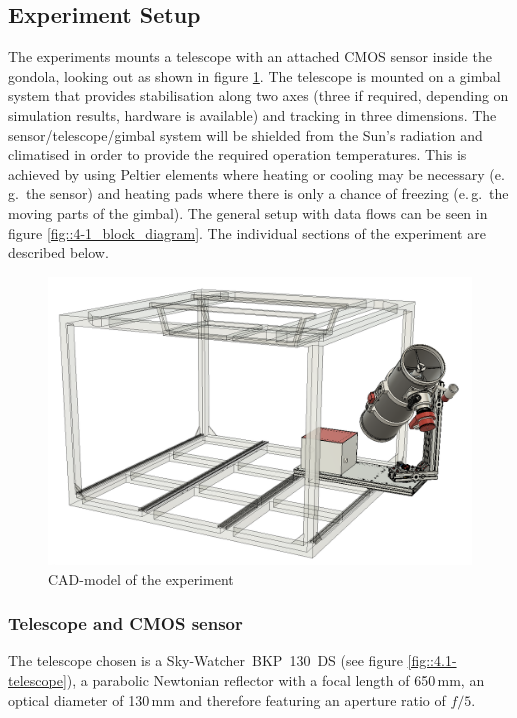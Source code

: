 \subsection{Experiment Setup} \label{Experiment_Setup}




The experiments mounts a telescope with an attached CMOS sensor inside the gondola, looking out as shown in figure \ref{fig::4-1_CAD}. The telescope is mounted on a gimbal system that provides stabilisation along two axes (three if required, depending on simulation results, hardware is available) and tracking in three dimensions. The sensor/telescope/gimbal system will be shielded from the Sun's radiation and climatised in order to provide the required operation temperatures. This is achieved by using Peltier elements where heating or cooling may be necessary (e.\,g.~the sensor) and heating pads where there is only a chance of freezing (e.\,g.~the moving parts of the gimbal). The general setup with data flows can be seen in figure \ref{fig::4-1_block_diagram}. The individual sections of the experiment are described below.

\begin{figure}[h]
	\centering
	\includegraphics[width=0.7\linewidth]{4-experiment-design/img/mechanical/iso0.png}
	\caption{CAD-model of the experiment}
	\label{fig::4-1_CAD}
\end{figure}


\subsubsection{Telescope and CMOS sensor}
The telescope chosen is a Sky-Watcher~BKP~130~DS (see figure \ref{fig::4.1-telescope}), a parabolic Newtonian reflector with a focal length of 650\,mm, an optical diameter of 130\,mm and therefore featuring an aperture ratio of $f/5$. 

